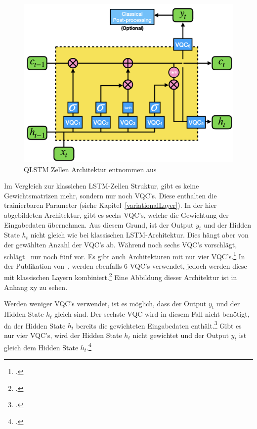 \begin{figure}[htb]
    \centering
    \includegraphics[width=13cm]{lib/graphics/qlstm.png}
    \caption[Quantum Long Short Term Memory Architektur]{\ac{QLSTM} Zellen Architektur entnommen aus~\cite[S. 10]{Chen2022}}
    \label{abb:qlstm}
\end{figure}

Im Vergleich zur klassichen \ac{LSTM}-Zellen Struktur, gibt es keine Gewichtsmatrizen mehr, sondern nur noch \ac{VQC}'s. Diese enthalten die trainierbaren Parameter (siehe Kapitel~\ref{variationalLayer}).
In der hier abgebildeten Architektur, gibt es sechs \ac{VQC}'s, welche die Gewichtung der Eingabedaten übernehmen. Aus diesem Grund, ist der Output $y_t$ und der Hidden State $h_t$ nicht gleich wie bei klassischen \ac{LSTM}-Architektur.
Dies hängt aber von der gewählten Anzahl der  \ac{VQC}'s ab. Während \cite[][]{Chen2022} noch sechs \ac{VQC}'s vorschlägt, schlägt~\cite[][]{Chen2023} nur noch fünf vor.
Es gibt auch Architekturen mit nur vier \ac{VQC}'s.\footcite[Vgl.][S. 4]{Yu2023}
In der Publikation von~\cite[][]{Cao2023}, werden ebenfalls 6 \ac{VQC}'s verwendet, jedoch werden diese mit klassischen Layern kombiniert.\footcite[Vgl.][S. 11]{Cao2023}
Eine Abbildung dieser Architektur ist in Anhang xy zu sehen.

Werden weniger \ac{VQC}'s verwendet, ist es möglich, dass der Output $y_t$ und der Hidden State $h_t$ gleich sind. Der sechste \ac{VQC} wird in diesem Fall nicht benötigt, da der Hidden State $h_t$ bereits die gewichteten Eingabedaten enthält.\footcite[Vgl.][S. 3]{Chen2023}
Gibt es nur vier \ac{VQC}'s, wird der Hidden State $h_t$ nicht gewichtet und der Output $y_t$ ist gleich dem Hidden State $h_t$.\footcite[Vgl.][S. 4]{Yu2023}
